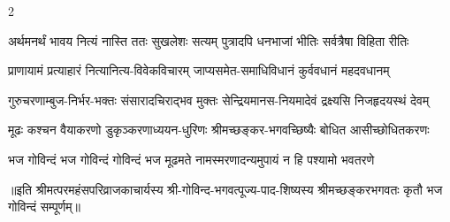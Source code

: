 \begin{large}
\begin{multicols}{2}
\begin{flushleft}
\fourlineindentedshloka
{अर्थमनर्थं भावय नित्यं}
{नास्ति ततः सुखलेशः सत्यम्}
{पुत्रादपि धनभाजां भीतिः}
{सर्वत्रैषा विहिता रीतिः}

\fourlineindentedshloka
{प्राणायामं प्रत्याहारं}
{नित्यानित्य-विवेकविचारम्}
{जाप्यसमेत-समाधिविधानं}
{कुर्ववधानं महदवधानम्}

\fourlineindentedshloka
{गुरुचरणाम्बुज-निर्भर-भक्तः}
{संसारादचिराद्भव मुक्तः}
{सेन्द्रियमानस-नियमादेवं}
{द्रक्ष्यसि निजहृदयस्थं देवम्}

\fourlineindentedshloka
{मूढः कश्चन वैयाकरणो}
{डुकृञ्करणाध्ययन-धुरिणः}
{श्रीमच्छङ्कर-भगवच्छिष्यैः}
{बोधित आसीच्छोधितकरणः}

\fourlineindentedshloka
{भज गोविन्दं भज गोविन्दं}
{गोविन्दं भज मूढमते}
{नामस्मरणादन्यमुपायं}
{न हि पश्यामो भवतरणे}

\fourlineshloka{}{}{}{}
\fourlineshloka{}{}{}{}
\end{flushleft}
\end{multicols}
॥इति श्रीमत्परमहंसपरिव्राजकाचार्यस्य श्री-गोविन्द-भगवत्पूज्य-पाद-शिष्यस्य
श्रीमच्छङ्करभगवतः कृतौ भज गोविन्दं सम्पूर्णम्॥
\end{large}
\setlength{\shlokaspaceskip}{24pt}
\setlength{\columnseprule}{1pt}
\setlength{\columnsep}{30pt}